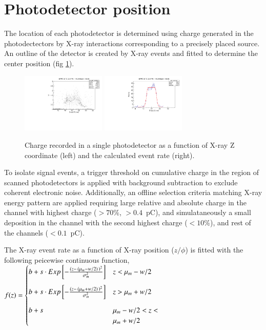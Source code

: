 \section{Photodetector position}\label{sec:mppcposition}
The location of each photodetector is determined using charge
generated in the photodectectors by X-ray interactions corresponding
to a precisely placed source.  An outline of the detector is created
by X-ray events and fitted to determine the center position (fig
\ref{fig:xrayevents}). 

\begin{figure}[h]
  \includegraphics[width=4cm]{plots/2018/hcharge67_z}
  \includegraphics[width=4cm]{plots/2018/mppc_fit}
  \caption{Charge recorded in a single photodetector as a function of X-ray Z coordinate 
  (left) and 
    the calculated event rate (right).}
  \label{fig:xrayevents}
\end{figure}  

To isolate signal events, a trigger threshold on cumulative charge 
in the region of scanned photodetectors is applied with background 
subtraction to exclude coherent electronic noise. Additionally, 
an offline selection criteria matching X-ray energy pattern are applied
requiring large relative and absolute charge in the channel with highest charge
($>70\%$, $>0.4$~pC), and simulataneously a small deposition 
in the channel with the second highest charge ($<10\%$),
and rest of the channels ($<0.1$~pC).

The X-ray event rate as a function of X-ray position ($z/\phi$) is
fitted with the following peicewise continuous function,\\
\begin{math}\label{eqn:mppcfitfcn}
f(z) = 
\begin{cases}
   b+s\cdot 
Exp\left[-\frac{(z - \, (\mu_m - w/2)\,)^2}{\sigma_m^2}\right] & z <
\mu_m-w/2  \vspace{3mm} \\
   b+s\cdot 
Exp\left[-\frac{(z - \, (\mu_m + w/2)\, )^2}{\sigma_m^2}\right] & z >
\mu_m+w/2    \vspace{3mm} \\
   b+s                                         & \mu_m - w/2 < z < \\
                                               & \mu_m + w/2    \\
\end{cases}
\end{math}

